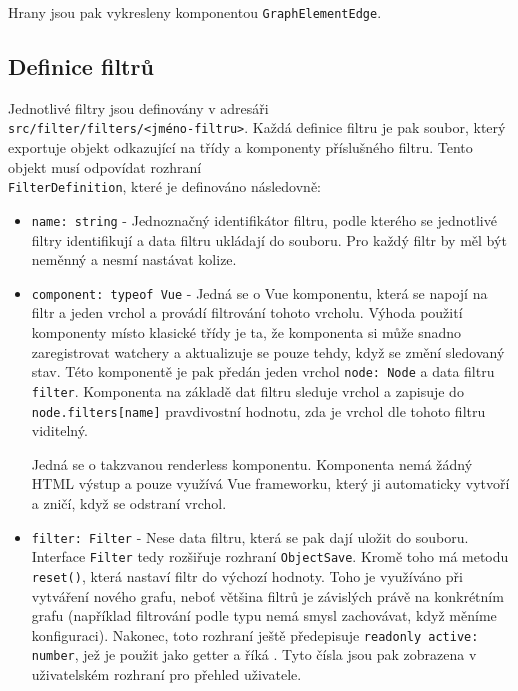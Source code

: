 \bigskip

Hrany jsou pak vykresleny komponentou \texttt{GraphElementEdge}.




\subsection{Definice filtrů}
Jednotlivé filtry jsou definovány v adresáři \\\texttt{src/filter/filters/<jméno-filtru>}. Každá definice filtru je pak soubor, který exportuje objekt odkazující na třídy a komponenty příslušného filtru. Tento objekt musí odpovídat rozhraní \\\texttt{FilterDefinition}, které je definováno následovně:

\begin{itemize}
  \item \texttt{name: string} - Jednoznačný identifikátor filtru, podle kterého se jednotlivé filtry identifikují a data filtru ukládají do souboru. Pro každý filtr by měl být neměnný a nesmí nastávat kolize.
  \item \texttt{component: typeof Vue} - Jedná se o Vue komponentu, která se napojí na filtr a jeden vrchol a provádí filtrování tohoto vrcholu. Výhoda použití komponenty místo klasické třídy je ta, že komponenta si může snadno zaregistrovat watchery a aktualizuje se pouze tehdy, když se změní sledovaný stav. Této komponentě je pak předán jeden vrchol \texttt{node: Node} a data filtru \texttt{filter}. Komponenta na základě dat filtru sleduje vrchol a zapisuje do \texttt{node.filters[name]} pravdivostní hodnotu, zda je vrchol dle tohoto filtru viditelný.

  Jedná se o takzvanou renderless komponentu. Komponenta nemá žádný HTML výstup a pouze využívá Vue frameworku, který ji automaticky vytvoří a zničí, když se odstraní vrchol.

  \item \texttt{filter: Filter} - Nese data filtru, která se pak dají uložit do souboru. Interface \texttt{Filter} tedy rozšiřuje rozhraní \texttt{ObjectSave}. Kromě toho má metodu \texttt{reset()}, která nastaví filtr do výchozí hodnoty. Toho je využíváno při vytváření nového grafu, neboť většina filtrů je závislých právě na konkrétním grafu (například filtrování podle typu nemá smysl zachovávat, když měníme konfiguraci). Nakonec, toto rozhraní ještě předepisuje \texttt{readonly active: number}, jež je použit jako getter a říká . Tyto čísla jsou pak zobrazena v uživatelském rozhraní pro přehled uživatele.


\end{itemize}
